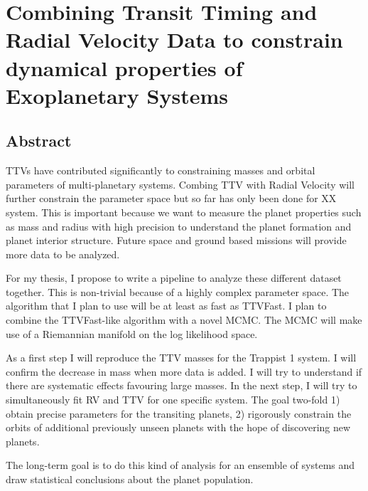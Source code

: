 \section{Combining Transit Timing and Radial Velocity Data to constrain dynamical properties of Exoplanetary Systems}

\subsection{Abstract}
TTVs have contributed significantly to constraining masses and orbital parameters of multi-planetary systems.
Combing TTV with Radial Velocity will further constrain the parameter space but so far has only been done for XX system. 
This is important because we want to measure the planet properties such as mass and radius with high precision to understand the planet formation and planet interior structure. 
Future space and ground based missions will provide more data to be analyzed.

For my thesis, I propose to write a pipeline to analyze these different dataset together. 
This is non-trivial because of a highly complex parameter space.
The algorithm that I plan to use will be at least as fast as TTVFast.
I plan to combine the TTVFast-like algorithm with a novel MCMC.
The MCMC will make use of a Riemannian manifold on the log likelihood space.

As a first step I will reproduce the TTV masses for the Trappist 1 system. 
I will confirm the decrease in mass when more data is added.
I will try to understand if there are systematic effects favouring large masses.
In the next step, I will try to simultaneously fit RV and TTV for one specific system. 
The goal two-fold 1) obtain precise parameters for the transiting planets, 2) rigorously constrain the orbits of additional previously unseen planets with the hope of discovering new planets.

The long-term goal is to do this kind of analysis for an ensemble of systems and draw statistical conclusions about the planet population.
